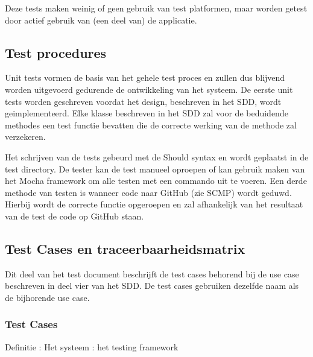 \documentclass[a4paper]{article}
\begin{document}
Deze tests maken weinig of geen gebruik van test platformen, maar worden getest door actief gebruik van (een deel van) de applicatie.

\subsection{Test procedures}

Unit tests vormen de basis van het gehele test proces en zullen dus blijvend worden uitgevoerd gedurende de ontwikkeling van het systeem. De eerste unit tests worden geschreven voordat het design, beschreven in het SDD, wordt geimplementeerd. Elke klasse beschreven in het SDD zal voor de
beduidende methodes een test functie bevatten die de correcte werking van de methode zal verzekeren.\newline

Het schrijven van de tests gebeurd met de Should syntax en wordt geplaatst in de test directory. De tester kan de test manueel oproepen of kan gebruik maken van het Mocha framework om alle testen met een commando uit te voeren. Een derde methode van testen is wanneer code naar GitHub (zie SCMP) wordt geduwd. Hierbij wordt de correcte functie opgeroepen en zal afhankelijk van het resultaat van de test de code op GitHub staan.

\subsection{Test Cases en traceerbaarheidsmatrix}

Dit deel van het test document beschrijft de test cases  behorend bij de use case beschreven in deel vier van het SDD. De test cases gebruiken dezelfde naam als de bijhorende use case.

\subsubsection{Test Cases}

Definitie : Het systeem : het testing framework
\end{document}
